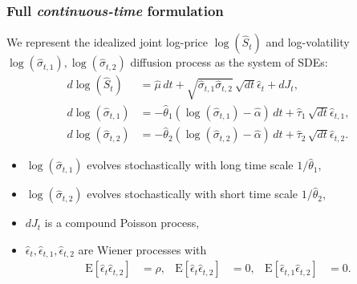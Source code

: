\documentclass{beamer}
\newcommand{\E}[1]{\mbox{E}\left[#1\right]}
\begin{document}
\begin{frame}
  \frametitle{Full \textit{continuous-time} formulation} We represent
  the idealized joint log-price $\log(\hat{S}_t)$ and log-volatility
  $\log(\hat{\sigma}_{t,1}), \log(\hat{\sigma}_{t,2})$ diffusion
  process as the system of SDEs:
  \begin{align*}
  d\log(\hat{S}_t) &= \hat{\mu}\, dt + \sqrt{\hat{\sigma}_{t,1} \hat{\sigma}_{t,2}}\, \sqrt{dt} \hat{\epsilon}_{t} + dJ_t  ,   \\
  d\log( \hat{ \sigma }_{t,1}) &= -\hat{\theta}_1 ( \log(\hat{\sigma}_{t,1} ) - \hat{\alpha} )\, dt + \hat{\tau}_1\, \sqrt{dt} \hat{\epsilon}_{t,1}  , \\
  d\log( \hat{ \sigma }_{t,2}) &= -\hat{\theta}_2 ( \log(\hat{\sigma}_{t,2} ) - \hat{\alpha} )\, dt + \hat{\tau}_2\, \sqrt{dt} \hat{\epsilon}_{t,2}  . 
  \end{align*}

  \begin{itemize}
  \item $\log(\hat{\sigma}_{t,1})$ evolves stochastically with long time scale $1/\hat{\theta}_1,$
  \item $\log(\hat{\sigma}_{t,2})$ evolves stochastically with short time scale $1/\hat{\theta}_2,$
  \item $dJ_t$ is a compound Poisson process,
  \item $\hat{\epsilon}_t, \hat{\epsilon}_{t,1}, \hat{\epsilon}_{t,2}$ are Wiener processes with 
    \begin{align*}
      \E{\hat{\epsilon}_t\hat{\epsilon}_{t,2}} &= \rho, & \E{\hat{\epsilon}_t\hat{\epsilon}_{t,2}} &= 0, & \E{\hat{\epsilon}_{t,1}\hat{\epsilon}_{t,2}} &= 0.
    \end{align*}
  \end{itemize}
    
\end{frame}
\end{document}

